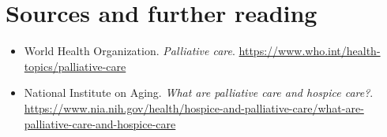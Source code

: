 \section*{Sources and further reading}
\begin{itemize}
\item World Health Organization. \textit{Palliative care}. \url{https://www.who.int/health-topics/palliative-care}
\item National Institute on Aging. \textit{What are palliative care and hospice care?}. \url{https://www.nia.nih.gov/health/hospice-and-palliative-care/what-are-palliative-care-and-hospice-care}
\end{itemize}
